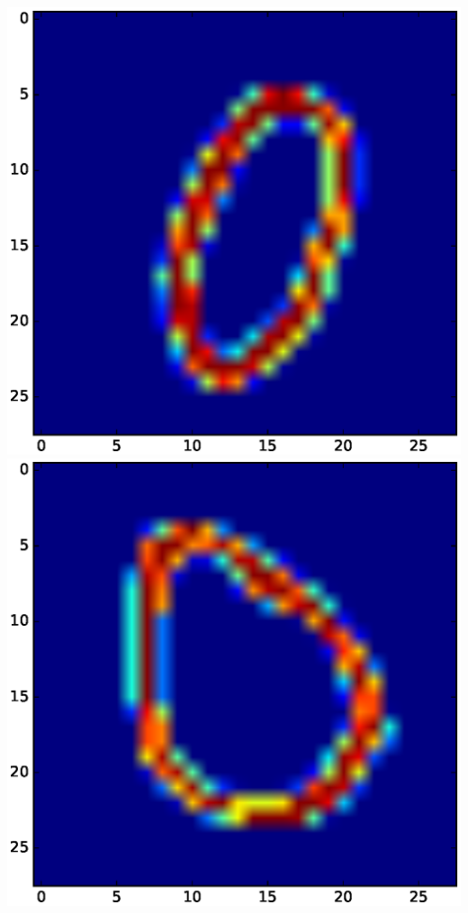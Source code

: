 \documentclass{article}
\begin{document}
\includegraphics[scale=.1]{fig/MNIST122.eps}
\includegraphics[scale=.1]{fig/MNIST124.eps}
\end{document}
